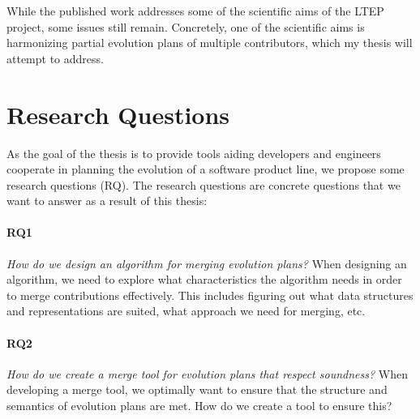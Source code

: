 \documentclass[a4paper,english]{ifimaster}
\newcommand{\todo}[1]{\textcolor{red}{[[TODO: #1]]}\PackageWarning{TODO:}{#1!}}
\begin{document}
While the published work addresses some of the scientific aims of the LTEP project, some issues still remain. Concretely, one of the scientific aims is harmonizing partial evolution plans of multiple contributors, which my thesis will attempt to address.

\section{Research Questions}%
\label{sec:research_questions}


As the goal of the thesis is to provide tools aiding developers and engineers cooperate in planning the evolution of a software product line, we propose some research questions (RQ). The research questions are concrete questions that we want to answer as a result of this thesis:

\paragraph{RQ1}

\textit{How do we design an algorithm for merging evolution plans?} When designing an algorithm, we need to explore what characteristics the algorithm needs in order to merge contributions effectively. This includes figuring out what data structures and representations are suited, what approach we need for merging, etc.

\paragraph{RQ2}

\textit{How do we create a merge tool for evolution plans that respect soundness?} When developing a merge tool, we optimally want to ensure that the structure and semantics of evolution plans are met. How do we create a tool to ensure this?
\end{document}
